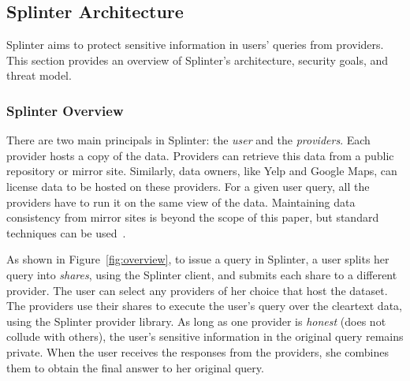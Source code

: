 \subsection{Splinter Architecture}
\label{sec:goals}

Splinter aims to protect sensitive information in users' queries
from providers. This section provides an overview of Splinter's architecture,
security goals, and threat model.

\subsubsection{Splinter Overview}
\label{sec:model}
There are two main principals in Splinter: the \emph{user} and the \emph{providers}.
Each provider hosts a copy of the data. Providers can 
retrieve this data from a public repository or mirror site.
Similarly, data owners, like Yelp and Google Maps, can license
data to be hosted on these providers.
For a given user query, all the providers have to run it on the same
view of the data. Maintaining data consistency
from mirror sites is beyond the scope of this paper, but
standard techniques can be used~\cite{tewari2002wcdp,chi2008novel}.

As shown in Figure~\ref{fig:overview}, 
to issue a query in Splinter, a user
splits her query into \textit{shares}, using the Splinter client,
and submits each share to a different provider.
The user can select any providers of her choice that host the dataset.
The providers use their shares to execute the user's query 
over the cleartext data, using the Splinter provider library. 
As long as one provider is \textit{honest}
(does not collude with others), the user's sensitive information in the original query
remains private. When the user receives the responses from the providers,
she combines them to obtain the final answer to her original query. 

